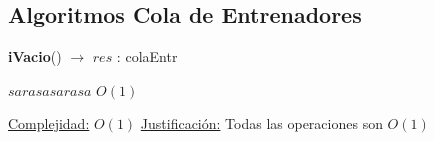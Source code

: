 \begin{Algoritmos}
\subsection{Algoritmos Cola de Entrenadores}


\begin{algorithm}[H]
{\textbf{iVacio}() $\to$ $res$ : colaEntr}
\begin{algorithmic}[1]
	\State $sarasa sarasa$ \Comment $O(1)$

	\medskip
	\Statex \underline{Complejidad:} $O(1)$
	\Statex \underline{Justificaci\'on:} Todas las operaciones son $O(1)$ 
\end{algorithmic}
\end{algorithm}
   
   
   
\end{Algoritmos}